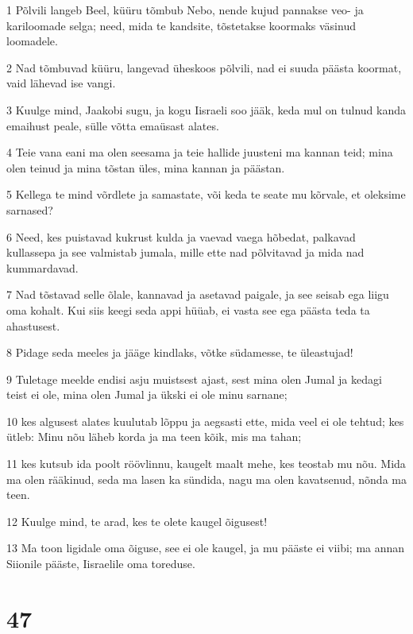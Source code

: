 \par 1 Põlvili langeb Beel, küüru tõmbub Nebo, nende kujud pannakse veo- ja kariloomade selga; need, mida te kandsite, tõstetakse koormaks väsinud loomadele.
\par 2 Nad tõmbuvad küüru, langevad üheskoos põlvili, nad ei suuda päästa koormat, vaid lähevad ise vangi.
\par 3 Kuulge mind, Jaakobi sugu, ja kogu Iisraeli soo jääk, keda mul on tulnud kanda emaihust peale, sülle võtta emaüsast alates.
\par 4 Teie vana eani ma olen seesama ja teie hallide juusteni ma kannan teid; mina olen teinud ja mina tõstan üles, mina kannan ja päästan.
\par 5 Kellega te mind võrdlete ja samastate, või keda te seate mu kõrvale, et oleksime sarnased?
\par 6 Need, kes puistavad kukrust kulda ja vaevad vaega hõbedat, palkavad kullassepa ja see valmistab jumala, mille ette nad põlvitavad ja mida nad kummardavad.
\par 7 Nad tõstavad selle õlale, kannavad ja asetavad paigale, ja see seisab ega liigu oma kohalt. Kui siis keegi seda appi hüüab, ei vasta see ega päästa teda ta ahastusest.
\par 8 Pidage seda meeles ja jääge kindlaks, võtke südamesse, te üleastujad!
\par 9 Tuletage meelde endisi asju muistsest ajast, sest mina olen Jumal ja kedagi teist ei ole, mina olen Jumal ja ükski ei ole minu sarnane;
\par 10 kes algusest alates kuulutab lõppu ja aegsasti ette, mida veel ei ole tehtud; kes ütleb: Minu nõu läheb korda ja ma teen kõik, mis ma tahan;
\par 11 kes kutsub ida poolt röövlinnu, kaugelt maalt mehe, kes teostab mu nõu. Mida ma olen rääkinud, seda ma lasen ka sündida, nagu ma olen kavatsenud, nõnda ma teen.
\par 12 Kuulge mind, te arad, kes te olete kaugel õigusest!
\par 13 Ma toon ligidale oma õiguse, see ei ole kaugel, ja mu pääste ei viibi; ma annan Siionile pääste, Iisraelile oma toreduse.

\chapter{47}

